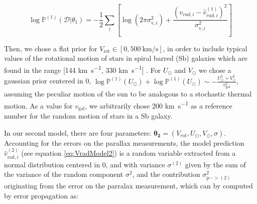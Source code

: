 \begin{equation}\label{Eq:LogLikeMod1}
    \log \mathbb{P}^{(1)}(\mathcal{D} \vert \theta_1) = -\frac{1}{2}\sum_i[\log(2\pi\sigma_{\text{v},i}^2)+\frac{(v_{rad,i} - \hat{v}_{rad,i}^{(1)})^2}{\sigma_{\text{v},i}^2}]
\end{equation}

Then, we chose a flat prior for $V_{\text{rot}}\in[0,\qty{500}{\kilo\meter\per\second}]$, 
in order to include typical values of the rotational motion of stars in spiral barred (Sb) galaxies 
which are found in the range [144 \unit{\kilo\meter\per\second}, 330 \unit{\kilo\meter\per\second}] \cite{Schneider2015}. 
For $U_\odot$ and $V_\odot$ we chose a gaussian prior centered in 0, 
$\log\mathbb{P}^{(1)}(U_\odot) + \log\mathbb{P}^{(1)}(U_\odot) \sim - \frac{U_\odot^2 + V_{\odot}^2}{v_{\text{gal}}^2}$, 
assuming the peculiar motion of the sun to be analogous to a stochastic thermal motion. 
As a value for $v_{\text{gal}}$, we arbitrarily chose 200 \unit{\kilo\meter\per\second} 
as a reference number for the random motion of stars in a Sb galaxy.

In our second model, there are four parameters: $\mathbf{\theta_2} = (V_{rot}, U_{\odot}, V_{\odot}, \sigma)$. 
Accounting for the errors on the parallax measurements, 
the model prediction $\hat{v}^{(2)}_{\text{rad}, i}$ (see equation \ref{eq:VradModel2}) is a random variable 
extracted from a normal distribution centered in 0, and with variance $\sigma^(2)$ 
given by the sum of the variance of the random component $\sigma^2$, 
and the contribution $\sigma^2_{\text{p} -> (2)}$ originating from the error on the parralax measurement, 
which can by computed by error propagation as:

